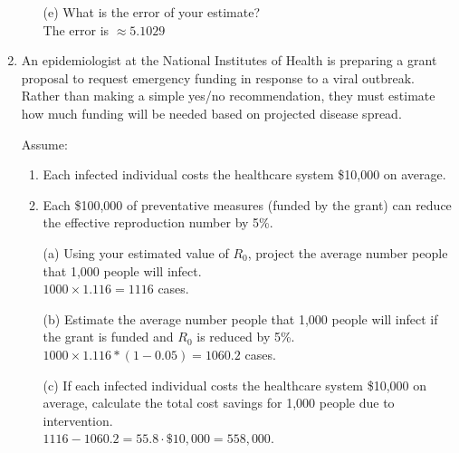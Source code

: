 \documentclass[11pt]{article}
\begin{document}
\begin{enumerate}
\begin{enumerate}
    \item[(e)] What is the error of your estimate?\\
    {\color{blue} The error is $\approx 5.1029$}
    \vspace{3cm}

    \end{enumerate}




    
\newpage
\item An epidemiologist at the National Institutes of Health is preparing a grant proposal to request emergency funding in response to a viral outbreak. Rather than making a simple yes/no recommendation, they must estimate how much funding will be needed based on projected disease spread.


Assume:
\begin{enumerate}
    \item Each infected individual costs the healthcare system \$10{,}000 on average.
    \item Each \$100{,}000 of preventative measures (funded by the grant) can reduce the effective reproduction number by 5\%.
\end{enumerate}
    \vspace{0.5cm}

\begin{enumerate}
    \item[(a)]  Using your estimated value of $R_0$, project the average number people that 1{,}000 people will infect.\\
{\color{blue}
$1000 \times 1.116 = 1116$ cases.
}
        \vspace{3cm}

    \item[(b)]  Estimate the average number people that 1{,}000 people will infect if the grant is funded and $R_0$ is reduced by 5\%.\\
{\color{blue}
$1000 \times 1.116*(1 - 0.05) = 1060.2$ cases.
}
        \vspace{3cm}

    \item[(c)]  If each infected individual costs the healthcare system \$10{,}000 on average, calculate the total cost savings  for 1{,}000 people due to intervention.\\
{\color{blue}
$1116 - 1060.2 = 55.8 \cdot \$10{,}000 = 558{,}000$.
}
        \vspace{3cm}


\end{enumerate}
\end{enumerate}
\end{document}
